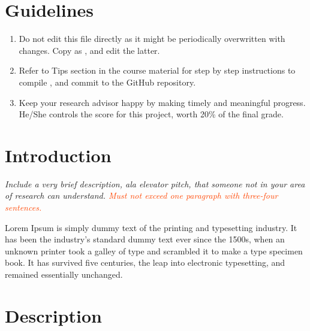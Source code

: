 \documentclass[letterpaper,12pt,fleqn]{article}
\begin{document}
\thispagestyle{empty}

\projecttitle

\section*{Guidelines}

\begin{enumerate}
  \item Do not edit this file directly as it might be periodically
        overwritten with changes. Copy  as 
        , and edit the latter.
  \item Refer to \textsf{Tips} section in the course material for step by
        step instructions to compile , 
        and commit  to the GitHub 
        repository.
  \item Keep your research advisor happy by making timely and meaningful
        progress. He/She controls the score for this project, worth 20\% of 
        the final grade.
\end{enumerate}

\newpage
\section*{Introduction}

\textsl{Include a very brief description, ala elevator pitch, that someone
not in your area of research can understand. \textcolor{OrangeRed}{Must not 
exceed one paragraph with three-four sentences.}}

Lorem Ipsum is simply dummy text of the printing and typesetting \cite{WC1953}
industry. It has been the industry's standard dummy text ever since the 1500s, 
when an unknown printer took \cite{TikZPGF, PlanetMath} a galley of type and 
scrambled it to make a type specimen book. It has survived five centuries, the 
leap into electronic typesetting, and remained essentially unchanged. 

\section*{Description}
\end{document}
